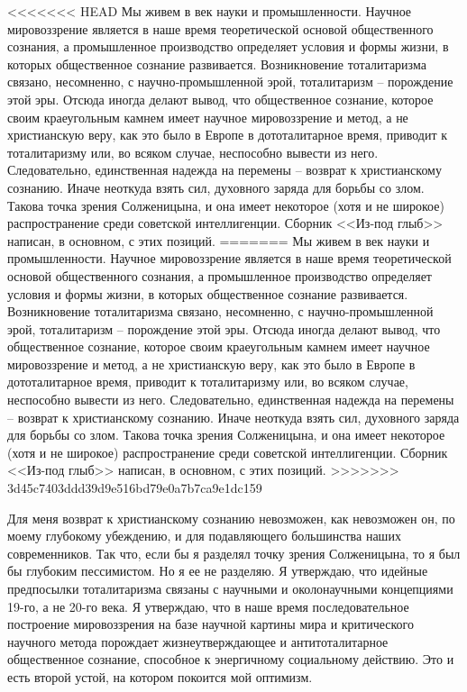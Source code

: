\documentclass{book}
\begin{document}
<<<<<<< HEAD
Мы живем в век науки и промышленности. Научное мировоззрение является в наше время теоретической основой общественного сознания, а промышленное производство определяет условия и формы жизни, в которых общественное сознание развивается. Возникновение тоталитаризма связано, несомненно, с научно‑промышленной эрой, тоталитаризм -- порождение этой эры. Отсюда иногда делают вывод, что общественное сознание, которое своим краеугольным камнем имеет научное мировоззрение и метод, а не христианскую веру, как это было в Европе в дототалитарное время, приводит к тоталитаризму или, во всяком случае, неспособно вывести из него. Следовательно, единственная надежда на перемены -- возврат к хри­стианскому сознанию. Иначе неоткуда взять сил, духовного заряда для борьбы со злом. Такова точка зрения Солженицына, и она имеет некоторое (хотя и не широкое) распространение среди советской интеллигенции. Сборник <<Из‑под глыб>> напи­сан, в основном, с этих позиций.
=======
Мы живем в век науки и промышленности. Научное мировоззрение является в наше время теоретической основой общественного сознания, а промышленное производство определяет условия и формы жизни, в которых общественное сознание развивается. Возникновение тоталитаризма связано, несомненно, с научно-промышленной эрой, тоталитаризм -- порождение этой эры. Отсюда иногда делают вывод, что общественное сознание, которое своим краеугольным камнем имеет научное мировоззрение и метод, а не христианскую веру, как это было в Европе в дототалитарное время, приводит к тоталитаризму или, во всяком случае, неспособно вывести из него. Следовательно, единственная надежда на перемены -- возврат к хри­стианскому сознанию. Иначе неоткуда взять сил, духовного заряда для борьбы со злом. Такова точка зрения Солженицына, и она имеет некоторое (хотя и не широкое) распространение среди советской интеллигенции. Сборник <<Из-под глыб>> напи­сан, в основном, с этих позиций.
>>>>>>> 3d45c7403ddd39d9e516bd79e0a7b7ca9e1dc159

Для меня возврат к христианскому сознанию невозможен, как невозможен он, по моему глубокому убеждению, и для подавляющего большинства наших современников. Так что, если бы я разделял точку зрения Солженицына, то я был бы глубоким пессимистом. Но я ее не разделяю. Я утверждаю, что идейные предпосылки тоталитаризма связаны с научными и околонаучными концепциями 19-го, а не 20-го века. Я утверждаю, что в наше время последовательное построение мировоз­зрения на базе научной картины мира и критического научного метода порождает жизнеутверждающее и антитоталитарное общественное сознание, способное к энергичному социальному действию. Это и есть второй устой, на котором покоится мой оптимизм.
\end{document}
